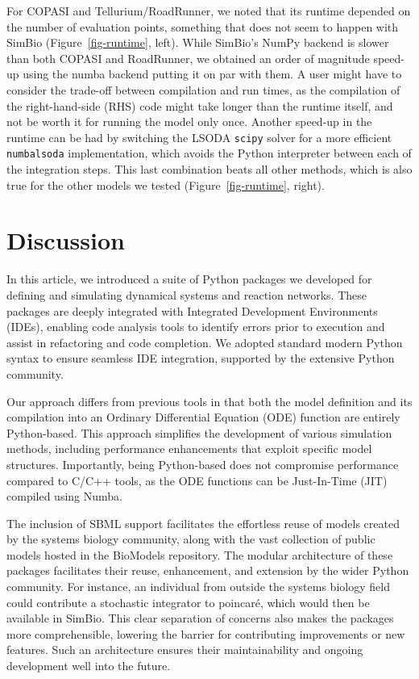 \documentclass[
  letterpaper,
  DIV=11,
  numbers=noendperiod]{scrartcl}
\begin{document}
For COPASI and Tellurium/RoadRunner, we noted that its runtime depended
on the number of evaluation points, something that does not seem to
happen with SimBio (Figure~\ref{fig-runtime}, left). While SimBio's
NumPy backend is slower than both COPASI and RoadRunner, we obtained an
order of magnitude speed-up using the numba backend putting it on par
with them. A user might have to consider the trade-off between
compilation and run times, as the compilation of the right-hand-side
(RHS) code might take longer than the runtime itself, and not be worth
it for running the model only once. Another speed-up in the runtime can
be had by switching the LSODA \texttt{scipy} solver for a more efficient
\texttt{numbalsoda} implementation, which avoids the Python interpreter
between each of the integration steps. This last combination beats all
other methods, which is also true for the other models we tested
(Figure~\ref{fig-runtime}, right).

\hypertarget{discussion}{%
\section{Discussion}\label{discussion}}

In this article, we introduced a suite of Python packages we developed
for defining and simulating dynamical systems and reaction networks.
These packages are deeply integrated with Integrated Development
Environments (IDEs), enabling code analysis tools to identify errors
prior to execution and assist in refactoring and code completion. We
adopted standard modern Python syntax to ensure seamless IDE
integration, supported by the extensive Python community.

Our approach differs from previous tools in that both the model
definition and its compilation into an Ordinary Differential Equation
(ODE) function are entirely Python-based. This approach simplifies the
development of various simulation methods, including performance
enhancements that exploit specific model structures. Importantly, being
Python-based does not compromise performance compared to C/C++ tools, as
the ODE functions can be Just-In-Time (JIT) compiled using Numba.

The inclusion of SBML support facilitates the effortless reuse of models
created by the systems biology community, along with the vast collection
of public models hosted in the BioModels repository. The modular
architecture of these packages facilitates their reuse, enhancement, and
extension by the wider Python community. For instance, an individual
from outside the systems biology field could contribute a stochastic
integrator to poincaré, which would then be available in SimBio. This
clear separation of concerns also makes the packages more
comprehensible, lowering the barrier for contributing improvements or
new features. Such an architecture ensures their maintainability and
ongoing development well into the future.
\end{document}
